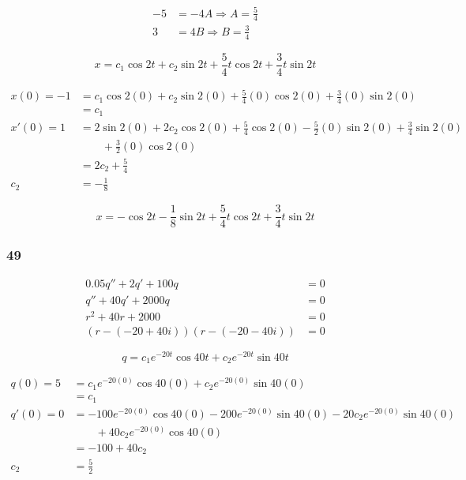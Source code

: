 \documentclass{article}
\begin{document}
\begin{align*}
  -5 & = -4 A \Rightarrow A = \frac{5}{4} \\
  3  & = 4 B \Rightarrow B = \frac{3}{4}
\end{align*}

\[x = c_1 \cos 2t + c_2 \sin 2t + \frac{5}{4} t \cos 2t + \frac{3}{4} t \sin 2t\]

\begin{align*}
  x(0) = -1 & = c_1 \cos 2 (0) + c_2 \sin 2 (0) + \frac{5}{4} (0) \cos 2 (0) + \frac{3}{4} (0) \sin 2 (0)                      \\
            & = c_1                                                                                                            \\
  x'(0) = 1 & = 2 \sin 2 (0) + 2 c_2 \cos 2 (0) + \frac{5}{4} \cos 2 (0) - \frac{5}{2} (0) \sin 2 (0) + \frac{3}{4} \sin 2 (0) \\
            & \qquad + \frac{3}{2} (0) \cos 2 (0)                                                                              \\
            & = 2 c_2 + \frac{5}{4}                                                                                            \\
  c_2       & = -\frac{1}{8}
\end{align*}

\[x = -\cos 2t - \frac{1}{8} \sin 2t + \frac{5}{4} t \cos 2t + \frac{3}{4} t \sin 2t\]

\subsubsection{49}

\begin{align*}
  0.05 q'' + 2 q' + 100 q             & = 0 \\
  q'' + 40 q' + 2000 q                & = 0 \\
  r^2 + 40 r + 2000                   & = 0 \\
  (r - (-20 + 40i)) (r - (-20 - 40i)) & = 0
\end{align*}

\[q = c_1 e^{-20t} \cos 40t + c_2 e^{-20t} \sin 40t\]

\begin{align*}
  q(0) = 5  & = c_1 e^{-20 (0)} \cos 40 (0) + c_2 e^{-20 (0)} \sin 40 (0)                                   \\
            & = c_1                                                                                         \\
  q'(0) = 0 & = -100 e^{-20 (0)} \cos 40 (0) - 200 e^{-20 (0)} \sin 40 (0) - 20 c_2 e^{-20 (0)} \sin 40 (0) \\
            & \qquad + 40 c_2 e^{-20 (0)} \cos 40 (0)                                                       \\
            & = -100 + 40 c_2                                                                               \\
  c_2       & = \frac{5}{2}
\end{align*}
\end{document}
